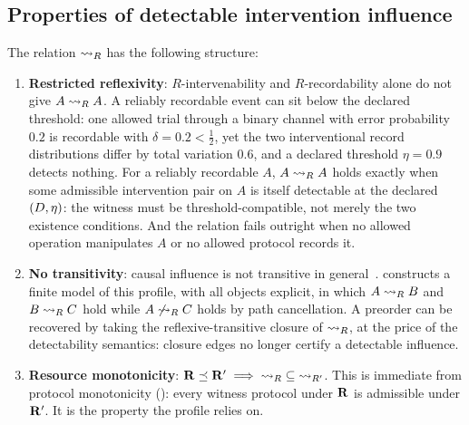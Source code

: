 \subsection{Properties of detectable intervention influence}

The relation $\rightsquigarrow_{R}$ has the following structure:
\begin{enumerate}
  \item \textbf{Restricted reflexivity}: $R$-intervenability and
        $R$-recordability alone do not give $A \rightsquigarrow_{R} A$.
        A reliably recordable event can sit below the declared
        threshold: one allowed trial through a binary channel with
        error probability $0.2$ is recordable with
        $\delta = 0.2 < \frac{1}{2}$, yet the two interventional
        record distributions differ by total variation $0.6$, and a
        declared threshold $\eta = 0.9$ detects nothing.
        For a reliably recordable $A$, $A \rightsquigarrow_{R} A$ holds
        exactly when some admissible intervention pair on $A$ is
        itself detectable at the declared
        $(D, \eta)$: the witness must be
        threshold-compatible, not merely the two existence
        conditions.  And the relation fails outright when no allowed
        operation manipulates $A$ or no allowed protocol records it.
  \item \textbf{No transitivity}: causal influence is not transitive
        in general~\cite{halpern2016actual}.  
        constructs a finite model of this profile, with all objects
        explicit, in which
        $A \rightsquigarrow_{R} B$ and $B \rightsquigarrow_{R} C$ hold while
        $A \not\rightsquigarrow_{R} C$ holds by path cancellation.  A
        preorder can be recovered by taking the reflexive-transitive
        closure of $\rightsquigarrow_{R}$, at the price of the
        detectability semantics: closure edges no longer certify a
        detectable influence.
  \item \textbf{Resource monotonicity}:
        $\mathbf{R} \preceq \mathbf{R}' \implies
         {\rightsquigarrow_{R}} \subseteq {\rightsquigarrow_{R'}}$.
        This is immediate from protocol monotonicity
        (): every witness protocol under
        $\mathbf{R}$ is admissible under $\mathbf{R}'$.  It is
        the property the profile relies on.
\end{enumerate}


